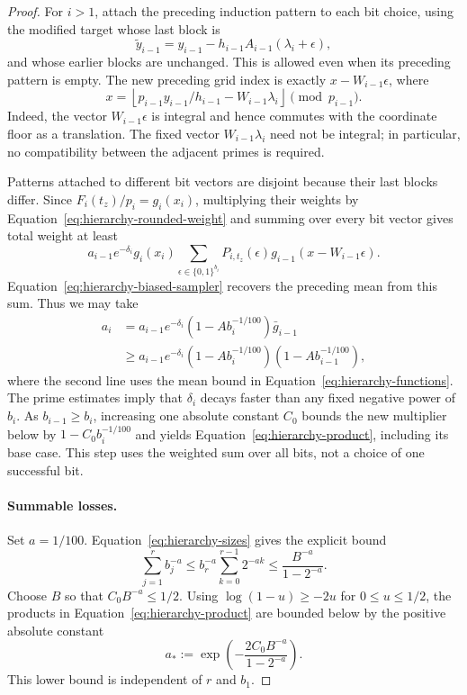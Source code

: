 \begin{proof}
For $i>1$, attach the preceding induction pattern to each bit choice,
using the modified target whose last block is
\[
 \widetilde y_{i-1}
    =y_{i-1}-h_{i-1}A_{i-1}(\lambda_i+\epsilon),
\]
and whose earlier blocks are unchanged.  This is allowed even when its
preceding pattern is empty.  The new preceding grid index is exactly
$x-W_{i-1}\epsilon$, where
\begin{equation}
 x=\left\lfloor p_{i-1}y_{i-1}/h_{i-1}
                    -W_{i-1}\lambda_i\right\rfloor\pmod {p_{i-1}}.
 \label{eq:hierarchy-grid-shift}
\end{equation}
Indeed, the vector $W_{i-1}\epsilon$ is integral and hence commutes with
the coordinate floor as a translation.  The fixed vector
$W_{i-1}\lambda_i$ need not be integral; in particular, no compatibility
between the adjacent primes is required.

Patterns attached to different bit vectors are disjoint because their
last blocks differ.  Since $F_i(t_z)/p_i=g_i(x_i)$, multiplying their
weights by Equation~\eqref{eq:hierarchy-rounded-weight} and summing over
every bit vector gives total weight at least
\[
 a_{i-1}e^{-\delta_i}g_i(x_i)
 \sum_{\epsilon\in\{0,1\}^{b_i}}
 P_{i,t_z}(\epsilon)g_{i-1}(x-W_{i-1}\epsilon).
\]
Equation~\eqref{eq:hierarchy-biased-sampler} recovers the preceding mean
from this sum.  Thus we may take
\[
 \begin{aligned}
 a_i&=a_{i-1}e^{-\delta_i}(1-A b_i^{-1/100})\bar g_{i-1}\\
    &\ge a_{i-1}e^{-\delta_i}
       (1-A b_i^{-1/100})(1-A b_{i-1}^{-1/100}),
 \end{aligned}
\]
where the second line uses the mean bound in
Equation~\eqref{eq:hierarchy-functions}.  The prime estimates imply that
$\delta_i$ decays faster than any fixed negative power of $b_i$.  As
$b_{i-1}\ge b_i$, increasing one absolute constant $C_0$ bounds the new
multiplier below by $1-C_0b_i^{-1/100}$ and yields
Equation~\eqref{eq:hierarchy-product}, including its base case.  This step
uses the weighted sum over all bits, not a choice of one successful bit.

\paragraph{Summable losses.}
Set $a=1/100$.  Equation~\eqref{eq:hierarchy-sizes} gives the explicit bound
\begin{equation}
 \sum_{j=1}^r b_j^{-a}
 \le b_r^{-a}\sum_{k=0}^{r-1}2^{-ak}
 \le \frac{B^{-a}}{1-2^{-a}}.
 \label{eq:hierarchy-summability}
\end{equation}
Choose $B$ so that $C_0B^{-a}\le1/2$.  Using
$\log(1-u)\ge-2u$ for $0\le u\le1/2$, the products in
Equation~\eqref{eq:hierarchy-product} are bounded below by the positive
absolute constant
\[
 a_*:=\exp\left(-\frac{2C_0B^{-a}}{1-2^{-a}}\right).
\]
This lower bound is independent of $r$ and $b_1$.


\end{proof}
